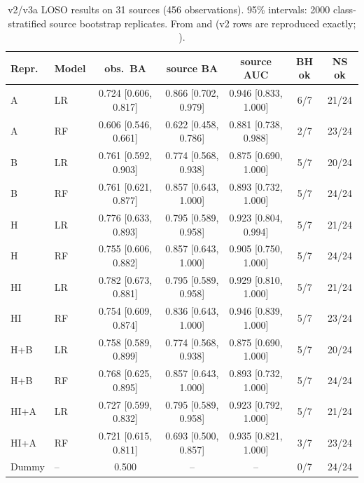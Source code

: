 \begin{table}[htbp]
\centering\small
\caption[v2 representations and models]{v2/v3a LOSO results on 31 sources (456 observations). 95\% intervals: 2000
class-stratified source bootstrap replicates. From  and 
(v2 rows are reproduced exactly; ).}
\label{tab:p1v2}
\begin{tabular}{@{}llccccc@{}}
\toprule
Repr. & Model & obs.\ BA & source BA & source AUC & BH ok & NS ok \\
\midrule
A & LR & 0.724 [0.606, 0.817] & 0.866 [0.702, 0.979] & 0.946 [0.833, 1.000] & 6/7 & 21/24 \\
A & RF & 0.606 [0.546, 0.661] & 0.622 [0.458, 0.786] & 0.881 [0.738, 0.988] & 2/7 & 23/24 \\
B & LR & 0.761 [0.592, 0.903] & 0.774 [0.568, 0.938] & 0.875 [0.690, 1.000] & 5/7 & 20/24 \\
B & RF & 0.761 [0.621, 0.877] & 0.857 [0.643, 1.000] & 0.893 [0.732, 1.000] & 5/7 & 24/24 \\
H & LR & 0.776 [0.633, 0.893] & 0.795 [0.589, 0.958] & 0.923 [0.804, 0.994] & 5/7 & 21/24 \\
H & RF & 0.755 [0.606, 0.882] & 0.857 [0.643, 1.000] & 0.905 [0.750, 1.000] & 5/7 & 24/24 \\
HI & LR & 0.782 [0.673, 0.881] & 0.795 [0.589, 0.958] & 0.929 [0.810, 1.000] & 5/7 & 21/24 \\
HI & RF & 0.754 [0.609, 0.874] & 0.836 [0.643, 1.000] & 0.946 [0.839, 1.000] & 5/7 & 23/24 \\
H+B & LR & 0.758 [0.589, 0.899] & 0.774 [0.568, 0.938] & 0.875 [0.690, 1.000] & 5/7 & 20/24 \\
H+B & RF & 0.768 [0.625, 0.895] & 0.857 [0.643, 1.000] & 0.893 [0.732, 1.000] & 5/7 & 24/24 \\
HI+A & LR & 0.727 [0.599, 0.832] & 0.795 [0.589, 0.958] & 0.923 [0.792, 1.000] & 5/7 & 21/24 \\
HI+A & RF & 0.721 [0.615, 0.811] & 0.693 [0.500, 0.857] & 0.935 [0.821, 1.000] & 3/7 & 23/24 \\
\midrule
Dummy & -- & 0.500 & -- & -- & 0/7 & 24/24 \\
\bottomrule
\end{tabular}
\end{table}

